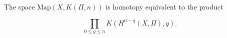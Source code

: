 The space $\text{Map}(X, K(\Pi, n))$ is homotopy equivalent to the product

$$\prod_{0 \leq q \leq n} K(H^{n-q}(X, \Pi), q).$$
